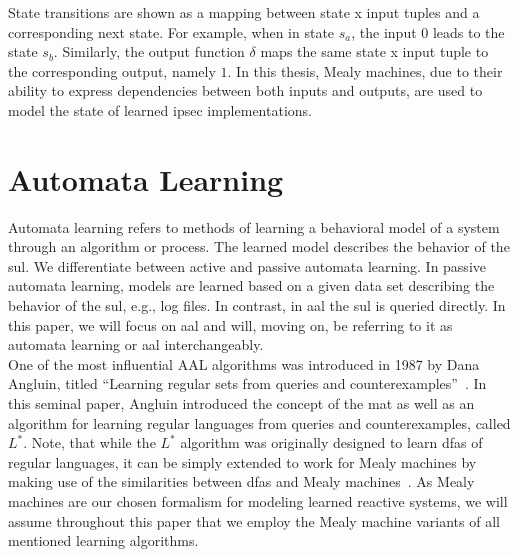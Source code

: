 State transitions are shown as a mapping between state x input tuples and a corresponding next state. For example, when in state $s_a$, the input $0$ leads to the state $s_b$. Similarly, the output function $\delta$ maps the same state x input tuple to the corresponding output, namely $1$. In this thesis, Mealy machines, due to their ability to express dependencies between both inputs and outputs, are used to model the state of learned \ac{ipsec} implementations.

\section{Automata Learning}
Automata learning refers to methods of learning a behavioral model of a system through an algorithm or process. The learned model describes the behavior of the \ac{sul}. We differentiate between active and passive automata learning. In passive automata learning, models are learned based on a given data set describing the behavior of the \ac{sul}, e.g., log files. In contrast, in \acf{aal} the \ac{sul} is queried directly. In this paper, we will focus on \ac{aal} and will, moving on, be referring to it as automata learning or \ac{aal} interchangeably. \\

One of the most influential AAL algorithms was introduced in 1987 by Dana Angluin, titled ``Learning regular sets from queries and counterexamples''~\cite{angluin1987learning}. In this seminal paper, Angluin introduced the concept of the \ac{mat} as well as an algorithm for learning regular languages from queries and counterexamples, called $L^*$. Note, that while the $L^*$ algorithm was originally designed to learn \acp{dfa} of regular languages, it can be simply extended to work for Mealy machines by making use of the similarities between \acp{dfa} and Mealy machines~\cite{hungar2003domain, shahbaz2009inferring}. As Mealy machines are our chosen formalism for modeling learned reactive systems, we will assume throughout this paper that we employ the Mealy machine variants of all mentioned learning algorithms. 

